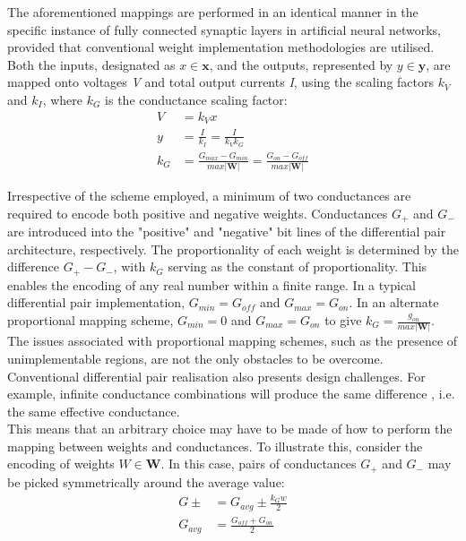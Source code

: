 \noindent The aforementioned mappings are performed in an identical manner in the specific instance of fully connected synaptic layers in artificial neural networks, provided that conventional weight implementation methodologies are utilised. Both the inputs, designated as $x \in \mathbf{x}$, and the outputs, represented by $y \in \mathbf{y}$, are mapped onto voltages \textit{V} and total output currents \textit{I}, using the scaling factors $k_V$ and $k_I$, where $k_G$ is the conductance scaling factor:
\begin{align}
V &= k_V x \label{eq:4.23} \\
y &= \frac{I}{k_I} = \frac{I}{k_V k_G} \label{eq:4.24} \\
k_G &= \frac{G_{max} - G_{min}}{max |\mathbf{W}|} = \frac{G_{on} - G_{off}}{max |\mathbf{W}|}\label{eq:4.25}
\end{align}

\noindent  Irrespective of the scheme employed, a minimum of two conductances are required to encode both positive and negative weights. Conductances $G_+$ and $G_-$ are introduced into the "positive" and "negative" bit lines of the differential pair architecture, respectively. The proportionality of each weight is determined by the difference $G_+ - G_-$, with $k_G$ serving as the constant of proportionality. This enables the encoding of any real number within a finite range. In a typical differential pair implementation, $G_{min} = G_{off}$ and $G_{max} = G_{on}$. In an alternate proportional mapping scheme, $G_{min} = 0$ and $G_{max} = G_{on}$ to give $k_G = \frac{g_{on}}{max |\mathbf{W}|}$.\\

\noindent The issues associated with proportional mapping schemes, such as the presence of unimplementable regions, are not the only obstacles to be overcome. Conventional differential pair realisation also presents design challenges. For example, infinite conductance combinations will produce the same difference \cite{kim20214k}, i.e. the same effective conductance. \\

\noindent This means that an arbitrary choice may have to be made of how to perform the mapping between weights and conductances. To illustrate this, consider the encoding of weights $W \in \mathbf{W}$. In this case, pairs of conductances $G_+$ and $G_-$ may be picked symmetrically around the average value:
\begin{align}
G\pm &= G_{avg} \pm \frac{k_G w}{2} \label{eq:4.26} \\
G_{avg} &= \frac{G_{off} + G_{on}}{2} \label{eq:4.27}
\end{align}


